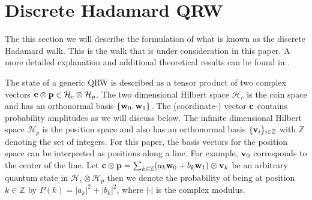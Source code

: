 \documentclass{siamart1116}
\begin{document}


\section{Discrete Hadamard QRW}\label{s:Hadamard}

The this section we will describe the formulation of what is known as 
the discrete Hadamard walk. This is the walk that is under consideration in this paper. 
A more detailed explanation and additional theoretical results can be found in 
\cite[Sec.\ 2.2]{venegas}. 

The state of a generic QRW  is described as a tensor product of two complex vectors 
${\bf c}\otimes {\bf p}\in \mathcal{H}_c\otimes\mathcal{H}_p$. The two dimensional Hilbert space 
$\mathcal{H}_c$ is the coin space and has an orthonormal basis $\{{\bf w}_0,{\bf w}_1\}$. The 
(coordinate-) vector ${\bf c}$ contains probability amplitudes as we will discuss below. 
The infinite dimensional Hilbert space $\mathcal{H}_p$ is the position space and also has an orthonormal 
basis $\{{\bf v}_i\}_{i\in\mathbb{Z}}$ with $\mathbb{Z}$ denoting the set of integers. 
For this paper, the basis vectors for the position space can be interpreted as positions along a line. 
For example, ${\bf v}_0$ corresponds to the center of the line. Let ${\bf c}\otimes{\bf p}=\sum_{k\in\mathbb{Z}}(a_k{\bf w}_0+b_k{\bf w}_1)\otimes{\bf v}_k$ be an arbitrary quantum state in 
$\mathcal{H}_c\otimes\mathcal{H}_p$ then we denote the probability of being at position $k\in\mathbb{Z}$
by $P(k)=|a_k|^2+|b_k|^2$, where $|\cdot|$ is the complex modulus.
\end{document}
